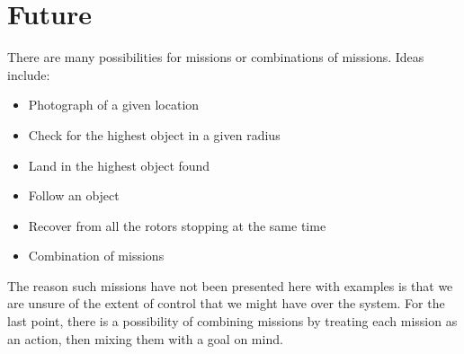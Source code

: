 \documentclass[12pt, a4paper]{article}
\begin{document}
	
	
	
\section{Future}
There are many possibilities for missions or combinations of missions. Ideas include:
\begin{itemize}
\itemsep-.5em
\item Photograph of a given location
\item Check for the highest object in a given radius   
\item Land in the highest object found
\item Follow an object
\item Recover from all the rotors stopping at the same time 
\item Combination of missions 		
\end{itemize}
The reason such missions have not been presented here with examples is that we are  unsure of the extent of control that we might have over the system. For the last point, there is a possibility of combining missions by treating each mission as an action, then mixing them with a goal on mind.  
	 

	
\end{document}
